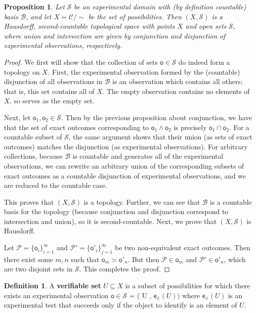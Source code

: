 \documentclass[review]{elsarticle}
\theoremstyle{plain}%
\newtheorem{prop}[thm]{Proposition}
\theoremstyle{definition}
\newtheorem{defn}{Definition}[section]
\theoremstyle{remark}
\begin{document}
\begin{prop}
Let $\mathcal{S}$ be an experimental domain with (by definition countable) basis $\mathcal{B}$, and let $X = \mathcal{C}/\sim$ be the set of possibilities. Then $(X,\mathcal{S})$ is a Hausdorff, second-countable topological space with points $X$ and open sets $\mathcal{S}$, where union and intersection are given by conjunction and disjunction of experimental observations, respectively. 
\end{prop}
\begin{proof}
We first will show that the collection of sets $\mathsf{o}\in\mathcal{S}$ do indeed form a topology on $X$. First, the experimental observation formed by the (countable) disjunction of all observations in $\mathcal{B}$ is an observation which contains all others; that is, this set contains all of $X$. The empty observation contains no elements of $X$, so serves as the empty set. 

Next, let $\mathsf{o}_1,\mathsf{o}_2\in\mathcal{S}$. Then by the previous proposition about conjunction, we have that the set of exact outcomes corresponding to $\mathsf{o}_1\wedge\mathsf{o}_2$ is precisely $\mathsf{o}_1\cap\mathsf{o}_2$. For a countable subset of $\mathcal{S}$, the same argument shows that their union (as sets of exact outcomes) matches the disjunction (as experimental observations). For arbitrary collections, because $\mathcal{B}$ is countable and generates all of the experimental observations, we can rewrite an arbitrary union of the corresponding subsets of exact outcomes as a countable disjunction of experimental observations, and we are reduced to the countable case. 

This proves that $(X,\mathcal{S})$ is a topology. Further, we can see that $\mathcal{B}$ is a countable basis for the topology (because conjunction and disjunction correspond to intersection and union), so it is second-countable. Next, we prove that $(X,\mathcal{S})$ is Hausdorff. 

Let $\mathcal{P} = \{\mathsf{o}_i\}_{i=1}^{\infty}$ and $\mathcal{P}' = \{\mathsf{o}'_i\}_{j=1}^{\infty}$ be two non-equivalent exact outcomes. Then there exist some $m,n$ such that $\mathsf{o}_m\asymp\mathsf{o}'_n$. But then $\mathcal{P}\in\mathsf{o}_m$ and $\mathcal{P}'\in\mathsf{o}'_n$, which are two disjoint sets in $\mathcal{S}$. This completes the proof. 
\end{proof}



\begin{defn}
	A \textbf{verifiable set} $U \subseteq X$ is a subset of possibilities for which there exists an experimental observation $\mathsf{o}\in\mathcal{S}$  = ( U , $\mathsf{e}_\in(U))$ where $\mathsf{e}_\in(U)$ is an experimental test that succeeds only if the object to identify is an element of $U$.
\end{defn}
\end{document}
